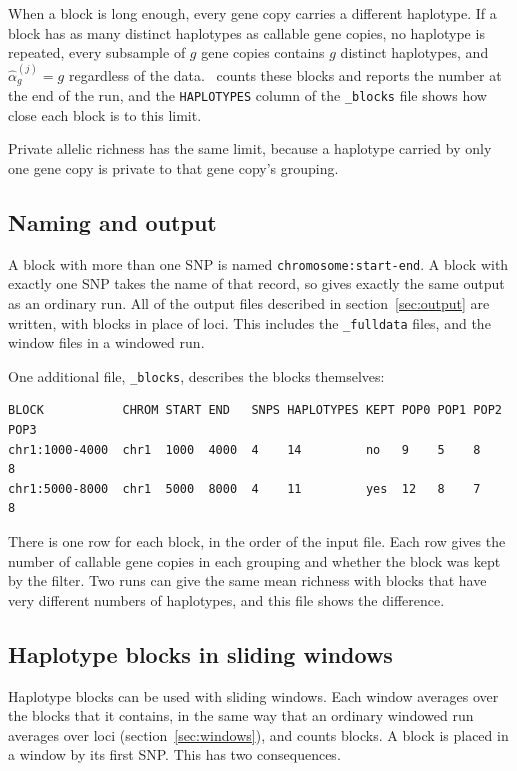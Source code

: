 When a block is long enough, every gene copy carries a different haplotype.
If a block has as many distinct haplotypes as callable gene copies, no
haplotype is repeated, every subsample of $g$ gene copies contains $g$ distinct
haplotypes, and $\hat{\alpha}_g^{(j)} = g$ regardless of the data. \prog\ counts
these blocks and reports the number at the end of the run, and the
\texttt{HAPLOTYPES} column of the \texttt{\_blocks} file shows how close each
block is to this limit.

Private allelic richness has the same limit, because a haplotype carried by
only one gene copy is private to that gene copy's grouping. 

\subsection{Naming and output}

\label{sec:blocksfile}

A block with more than one SNP is named \texttt{chromosome:start-end}. A block
with exactly one SNP takes the name of that record, so 
gives exactly the same output as an ordinary run. All of the output files
described in section~\ref{sec:output} are written, with blocks in place of
loci. This includes the \texttt{\_fulldata} files, and the window files in a
windowed run.

One additional file, \texttt{\_blocks}, describes the blocks themselves:

\begin{Verbatim}[frame=single,fontsize=\footnotesize]
BLOCK           CHROM START END   SNPS HAPLOTYPES KEPT POP0 POP1 POP2 POP3
chr1:1000-4000  chr1  1000  4000  4    14         no   9    5    8    8
chr1:5000-8000  chr1  5000  8000  4    11         yes  12   8    7    8
\end{Verbatim}

\noindent There is one row for each block, in the order of the input file. Each
row gives the number of callable gene copies in each grouping and whether the
block was kept by the filter. Two runs can give the same mean richness with
blocks that have very different numbers of haplotypes, and this file shows the
difference.

\subsection{Haplotype blocks in sliding windows}

Haplotype blocks can be used with sliding windows. Each window averages over
the blocks that it contains, in the same way that an ordinary windowed run
averages over loci (section~\ref{sec:windows}), and 
counts blocks. A block is placed in a window by its first SNP. This has two
consequences.

